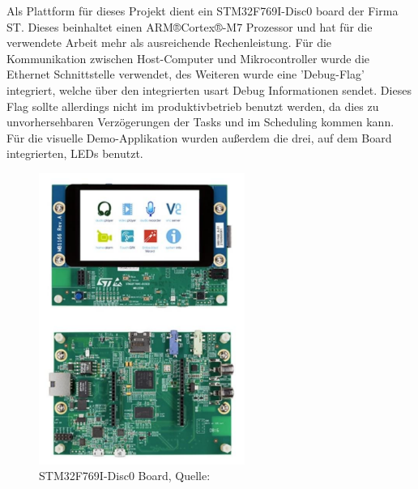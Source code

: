 \documentclass[../EDF Master Thesis.tex]{subfiles}
\begin{document}
Als Plattform für dieses Projekt dient ein STM32F769I-Disc0 board der Firma ST.
Dieses beinhaltet einen ARM®Cortex®-M7 Prozessor und hat für die verwendete Arbeit mehr als ausreichende Rechenleistung.
Für die Kommunikation zwischen Host-Computer und Mikrocontroller wurde die Ethernet Schnittstelle verwendet, des Weiteren wurde eine 'Debug-Flag' integriert, welche über den integrierten \ac{usart} Debug Informationen sendet.
Dieses Flag sollte allerdings nicht im produktivbetrieb benutzt werden, da dies zu unvorhersehbaren Verzögerungen der Tasks und im Scheduling kommen kann.
Für die visuelle Demo-Applikation wurden außerdem die drei, auf dem Board integrierten, LEDs benutzt.

\begin{figure}[ht!]
    \begin{center}
        \includegraphics[width=0.6\textwidth]{attachments/stm32f769i-disc0.pdf}
    \end{center}
    \caption{STM32F769I-Disc0 Board, Quelle: \autocite{stm:001}}
    \label{fig:STM32F769I-Disc0_board}
\end{figure}
\end{document}
